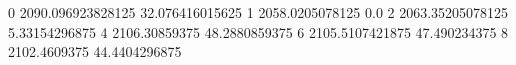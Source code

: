 0 2090.096923828125 32.076416015625
1 2058.0205078125 0.0
2 2063.35205078125 5.33154296875
4 2106.30859375 48.2880859375
6 2105.5107421875 47.490234375
8 2102.4609375 44.4404296875
